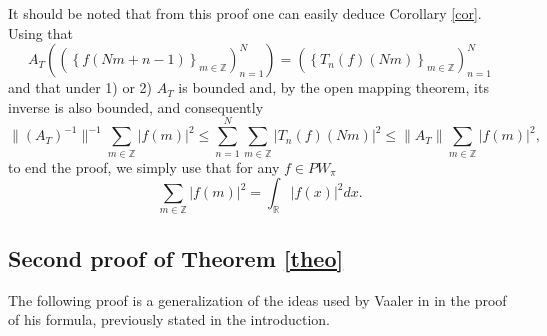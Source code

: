 \documentclass[reqno]{amsart}
\theoremstyle{plain}
\theoremstyle{definition}
\numberwithin{equation}{section}
\newcommand{\Z}{{\mathbb Z}}
\newcommand{\R}{{\mathbb R}}
\newcommand{\pa}[1]{\left(#1\right)}
\newcommand{\abs}[1]{\left\vert#1\right\vert}
\providecommand{\abs}[1]{ \lvert#1  \rvert}
\providecommand{\norm}[1]{ \lVert#1  \rVert}
\begin{document}
It should be noted that from this proof one can easily deduce Corollary \ref{cor}. Using that
$$A_T\pa{\pa{\left\{ f(Nm+n-1) \right\}_{m\in\Z}}_{n=1}^N}=\pa{\left\{ T_n(f)(Nm)\right\}_{m\in\Z}}_{n=1}^N$$
and that under 1) or 2) $A_T$ is bounded and, by the open mapping theorem, its inverse is also bounded, and consequently
$$\norm{(A_T)^{-1}}^{-1} \sum_{m\in\Z}\abs{f(m)}^2
\leq \sum_{n=1}^N \sum_{m\in\Z} \abs{T_n(f)(Nm)}^2 
\leq \norm{A_T} \sum_{m\in\Z}\abs{f(m)}^2,$$
to end the proof, we simply use that for any $f\in PW_\pi$
$$ \sum_{m\in\Z}\abs{f(m)}^2=\int_\R \abs{f(x)}^2 dx.$$

\subsection{Second proof of Theorem \ref{theo}}
The following proof is a generalization of the ideas used by Vaaler in \cite{Va1985} in the proof of his formula, previously stated in the introduction.
\end{document}
